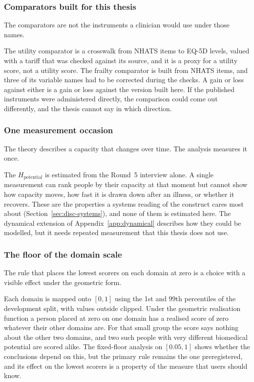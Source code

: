 \subsubsection{Comparators built for this thesis}

The comparators are not the instruments a clinician would use under those names.

The utility comparator is a crosswalk from NHATS items to EQ-5D levels, valued with
a tariff that was checked against its source, and it is a proxy for a utility score,
not a utility score. The frailty comparator is built from NHATS items, and three of
its variable names had to be corrected during the checks. A gain or loss against
either is a gain or loss against the version built here. If the published
instruments were administered directly, the comparison could come out differently,
and the thesis cannot say in which direction.

\subsubsection{One measurement occasion}

The theory describes a capacity that changes over time. The analysis measures it
once.

The $H_{\text{potential}}$ is estimated from the Round~5 interview alone. A single
measurement can rank people by their capacity at that moment but cannot show how
capacity moves, how fast it is drawn down after an illness, or whether it recovers.
These are the properties a systems reading of the construct cares most about
(Section~\ref{sec:disc-systems}), and none of them is estimated here. The dynamical
extension of Appendix~\ref{app:dynamical} describes how they could be modelled, but
it needs repeated measurement that this thesis does not use.

\subsubsection{The floor of the domain scale}

The rule that places the lowest scorers on each domain at zero is a choice with a
visible effect under the geometric form.

Each domain is mapped onto $[0,1]$ using the 1st and 99th percentiles of the
development split, with values outside clipped. Under the geometric realisation
function a person placed at zero on one domain has a realised score of zero whatever
their other domains are. For that small group the score says nothing about the other
two domains, and two such people with very different biomedical potential are scored
alike. The fixed-floor analysis on $[0.05,1]$ shows whether the conclusions depend
on this, but the primary rule remains the one preregistered, and its effect on the
lowest scorers is a property of the measure that users should know.

